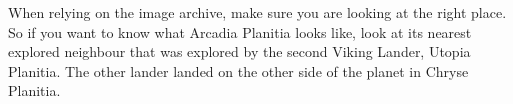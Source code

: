 When relying on the image archive, make sure you are looking at the right place. So if you want to know what Arcadia Planitia looks like, look at its nearest explored neighbour that was explored by the second Viking Lander, Utopia Planitia. The other lander landed on the other side of the planet in Chryse Planitia.

\StopChapter

